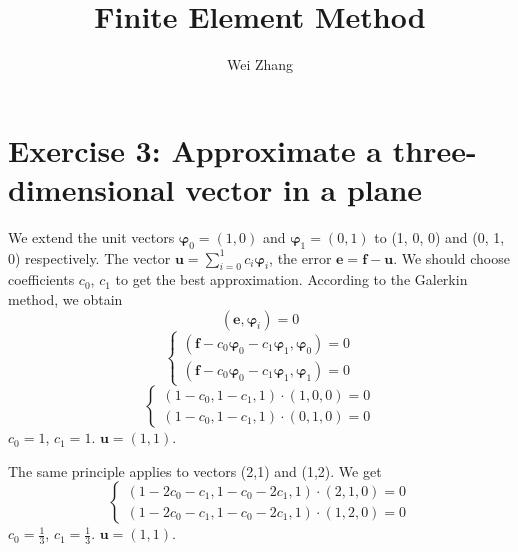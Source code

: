 \documentclass{article}
\begin{document}
\title{Finite Element Method}
\author{Wei Zhang}
\large
\maketitle

\section{Exercise 3: Approximate a three-dimensional vector in a plane}
We extend the unit vectors $\boldsymbol{\varphi}_{0}=(1,0)$ and $\boldsymbol{\varphi}_{1}=(0,1)$ to (1, 0, 0) and (0, 1, 0) respectively. The vector $\textbf{u}=\displaystyle \sum^{1}_{i=0}c_{i}\boldsymbol{\varphi}_{i}$, the error $\textbf{e}=\textbf{f}-\textbf{u}$. We should choose coefficients $c_{0}$, $c_{1}$ to get the best approximation. According to the Galerkin method, we obtain
\begin{equation}
(\textbf{e},\boldsymbol{\varphi}_{i})=0
\end{equation}
\begin{equation*}
\begin{cases}
(\textbf{f}-c_{0}\boldsymbol{\varphi}_{0}-c_{1}\boldsymbol{\varphi}_{1},\boldsymbol{\varphi}_{0})=0\\
(\textbf{f}-c_{0}\boldsymbol{\varphi}_{0}-c_{1}\boldsymbol{\varphi}_{1},\boldsymbol{\varphi}_{1})=0
\end{cases}
\end{equation*}
\begin{equation*}
\begin{cases}
(1-c_{0},1-c_{1},1)\cdot(1, 0, 0)=0\\
(1-c_{0},1-c_{1},1)\cdot(0, 1, 0)=0
\end{cases}
\end{equation*}
$c_{0}=1$, $c_{1}=1$. $\textbf{u}=(1, 1)$. \par
 The same principle applies to vectors (2,1) and (1,2). We get
\begin{equation*}
\begin{cases}
(1-2c_{0}-c_{1}, 1-c_{0}-2c_{1}, 1)\cdot(2, 1, 0)=0\\
(1-2c_{0}-c_{1}, 1-c_{0}-2c_{1}, 1)\cdot(1, 2, 0)=0
\end{cases}
\end{equation*}
$c_{0}=\displaystyle\frac{1}{3}$, $c_{1}=\displaystyle\frac{1}{3}$. $\textbf{u}=(1, 1)$.
\end{document}
